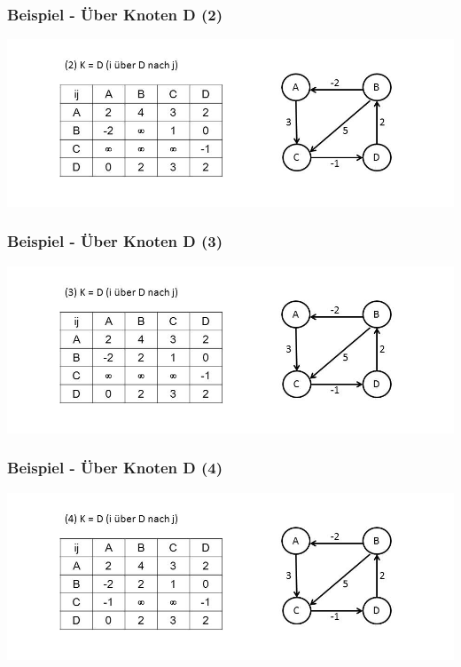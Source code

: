 
\begin{frame}
\frametitle{Beispiel - Über Knoten D (2)}

\includegraphics[width=\linewidth]{floyd_warshall_graphs/graph6.JPG}

\end{frame}


\begin{frame}
\frametitle{Beispiel - Über Knoten D (3)}

\includegraphics[width=\linewidth]{floyd_warshall_graphs/graph7.JPG}

\end{frame}


\begin{frame}
\frametitle{Beispiel - Über Knoten D (4)}

\includegraphics[width=\linewidth]{floyd_warshall_graphs/graph8.JPG}

\end{frame}

